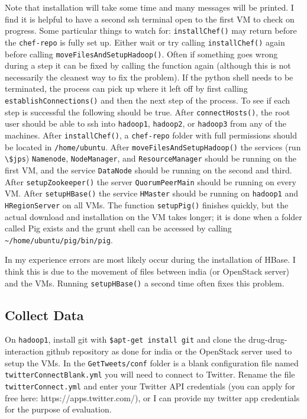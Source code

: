 \documentclass[letterpaper]{article}
\begin{document}
Note that installation will take some time and many messages will be printed. I find it is helpful to have a second ssh terminal open to the first VM to check on progress. Some particular things to watch for: \lstinline|installChef()| may return before the \lstinline|chef-repo| is fully set up. Either wait or try calling \lstinline|installChef()| again before calling \lstinline|moveFilesAndSetupHadoop()|. Often if something goes wrong during a step it can be fixed by calling the function again (although this is not necessarily the cleanest way to fix the problem). If the python shell needs to be terminated, the process can pick up where it left off by first calling \lstinline|establishConnections()| and then the next step of the process. To see if each step is successful the following should be true. After \lstinline|connectHosts()|, the root user should be able to ssh into \lstinline|hadoop1|, \lstinline|hadoop2|, or \lstinline|hadoop3| from any of the machines. After \lstinline|installChef()|, a \lstinline|chef-repo| folder with full permissions should be located in \lstinline|/home/ubuntu|. After \lstinline|moveFilesAndSetupHadoop()| the services (run \lstinline|\$jps|) \lstinline|Namenode|, \lstinline|NodeManager|, and \lstinline|ResourceManager| should be running on the first VM, and the service \lstinline|DataNode| should be running on the second and third. After \lstinline|setupZookeeper()| the server \lstinline|QuorumPeerMain| should be running on every VM. After \lstinline|setupHBase()| the service \lstinline|HMaster| should be running on \lstinline|hadoop1| and \lstinline|HRegionServer| on all VMs. The function \lstinline|setupPig()| finishes quickly, but the actual download and installation on the VM takes longer; it is done when a folder called Pig exists and the grunt shell can be accessed by calling \lstinline|~/home/ubuntu/pig/bin/pig|.

In my experience errors are most likely occur during the installation of HBase. I think this is due to the movement of files between india (or OpenStack server) and the VMs. Running \lstinline|setupHBase()| a second time often fixes this problem.

\subsection{Collect Data}


On \lstinline|hadoop1|, install git with \lstinline|$apt-get install git| and clone the drug-drug-interaction github repository as done for india or the OpenStack server used to setup the VMs. In the \lstinline|GetTweets/conf| folder is a blank configuration file named \lstinline|twitterConnectBlank.yml| you will need to connect to Twitter. Rename the file \lstinline|twitterConnect.yml| and enter your Twitter API credentials (you can apply for free here: https://apps.twitter.com/), or I can provide my twitter app credentials for the purpose of evaluation.
\end{document}
